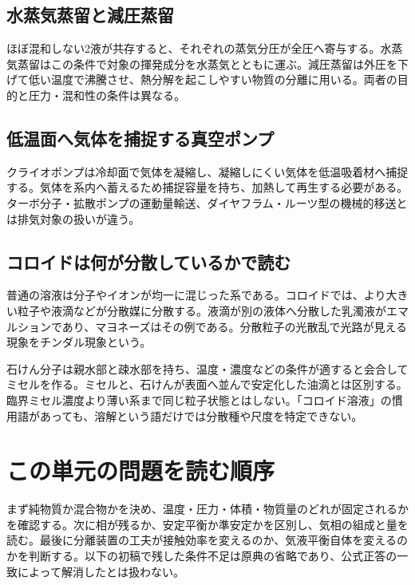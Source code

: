 \subsection{水蒸気蒸留と減圧蒸留}
\label{theory:phase_sep:steam}
ほぼ混和しない2液が共存すると、それぞれの蒸気分圧が全圧へ寄与する。水蒸気蒸留はこの条件で対象の揮発成分を水蒸気とともに運ぶ。減圧蒸留は外圧を下げて低い温度で沸騰させ、熱分解を起こしやすい物質の分離に用いる。両者の目的と圧力・混和性の条件は異なる。

\subsection{低温面へ気体を捕捉する真空ポンプ}
\label{theory:phase_sep:vacuum}
クライオポンプは冷却面で気体を凝縮し、凝縮しにくい気体を低温吸着材へ捕捉する。気体を系内へ蓄えるため捕捉容量を持ち、加熱して再生する必要がある\parencite{leybold_cryopump}。ターボ分子・拡散ポンプの運動量輸送、ダイヤフラム・ルーツ型の機械的移送とは排気対象の扱いが違う。

\subsection{コロイドは何が分散しているかで読む}
\label{theory:phase_sep:colloid}
普通の溶液は分子やイオンが均一に混じった系である。コロイドでは、より大きい粒子や液滴などが分散媒に分散する。液滴が別の液体へ分散した乳濁液がエマルションであり、マヨネーズはその例である。分散粒子の光散乱で光路が見える現象をチンダル現象という\parencite{openstax_colloids}。

\label{theory:phase_sep:micelle}
石けん分子は親水部と疎水部を持ち、温度・濃度などの条件が適すると会合してミセルを作る。ミセルと、石けんが表面へ並んで安定化した油滴とは区別する。臨界ミセル濃度より薄い系まで同じ粒子状態とはしない。「コロイド溶液」の慣用語があっても、溶解という語だけでは分散種や尺度を特定できない。

\section{この単元の問題を読む順序}
まず純物質か混合物かを決め、温度・圧力・体積・物質量のどれが固定されるかを確認する。次に相が残るか、安定平衡か準安定かを区別し、気相の組成と量を読む。最後に分離装置の工夫が接触効率を変えるのか、気液平衡自体を変えるのかを判断する。以下の初稿で残した条件不足は原典の省略であり、公式正答の一致によって解消したとは扱わない。

